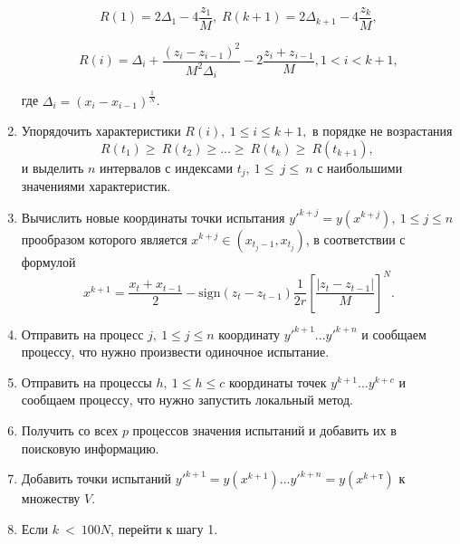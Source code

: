 \documentclass[runningheads]{llncs}
\begin{document}
\begin{enumerate}
	\begin{equation} 
		\label{agp3_R1} R(1)=2\Delta_1-4\dfrac{z_1}{M}, \; R(k+1)=2\Delta_{k+1}-4\dfrac{z_k}{M}, 
	\end{equation} 
	
	\begin{equation} 
		\label{agp3_Ri} R(i)=\Delta_i+\dfrac{(z_i-z_{i-1})^2}{M^2\Delta_i}-2\dfrac{z_i+z_{i-1}}{M},1<i<k+1, 
	\end{equation} 
	
	где \(\Delta_i=(x_i-x_{i-1})^\frac{1}{N}\).
	
	\item   Упорядочить характеристики $R\left(i\right),\ 1\leq i \leq k+1,$ в порядке не возрастания
	\begin{equation} 
		\label{agp4_R_sort} 	R\left(t_1\right)\geq\ R\left(t_2\right)\geq...\geq\ R\left(t_k\right)\geq\ R(t_{k+1}),\  
	\end{equation} 
	и выделить $n$ интервалов с индексами $t_j,\ 1\le\ j\le\ n$  с наибольшими значениями характеристик.	
	
	\item Вычислить новые координаты точки испытания $y'^{k+j}=y\left(x^{k+j}\right), \ 1\leq j\leq n$ прообразом которого является $x^{k+j}\in\left(x_{t_j-1},x_{t_j}\right)$, в соответствии с формулой
	\begin{equation}
		\label{agp5_x1}
		x^{k+1}=\frac{x_t+x_{t-1}}{2}-\mathrm{sign}\left(z_t-z_{t-1}\right)\frac{1}{2r}\left[\frac{\left|z_t-z_{t-1}\right|}{M}\right]^N.
	\end{equation}	
	
	
	\item Отправить на процесс $j, \ 1\leq j\leq n$ координату $y'^{k+1} ... y'^{k+n}$  и сообщаем процессу, что нужно произвести одиночное испытание.
	
	\item Отправить на процессы $h, \ 1\leq h\leq c$ координаты точек $y^{k+1} ... y^{k+c}$ и сообщаем процессу, что нужно запустить локальный метод.
	
	\item Получить со всех $p$ процессов значения испытаний и добавить их в поисковую информацию.
	
	\item Добавить точки испытаний $y'^{k+1}=y\left(x^{k+1}\right) ... y'^{k+n}=y\left(x^{k+т}\right)$ к множеству $V$.
	
	\item Если $k\ <\ 100 N$, перейти к шагу 1.
	

\end{enumerate}
\end{document}
